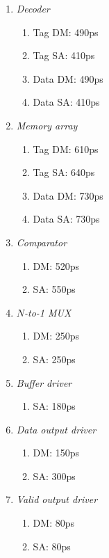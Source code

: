 \documentclass[11pt]{article}
\begin{document}

\begin{enumerate}[i]
	\item \textit{Decoder}
	      \begin{enumerate}[i]
		      \item Tag DM: 490ps
		      \item Tag SA: 410ps
		      \item Data DM: 490ps
		      \item Data SA: 410ps
	      \end{enumerate}
	\item \textit{Memory array}
	      \begin{enumerate}[i]
		      \item Tag DM: 610ps
		      \item Tag SA: 640ps
		      \item Data DM: 730ps
		      \item Data SA: 730ps
	      \end{enumerate}
	\item \textit{Comparator}
	      \begin{enumerate}[i]
		      \item DM: 520ps
		      \item SA: 550ps
	      \end{enumerate}
	\item \textit{$N$-to-1 MUX}
	      \begin{enumerate}[i]
		      \item DM: 250ps
		      \item SA: 250ps
	      \end{enumerate}
	\item \textit{Buffer driver}
	      \begin{enumerate}[i]
		      \item SA: 180ps
	      \end{enumerate}
	\item \textit{Data output driver}
	      \begin{enumerate}[i]
		      \item DM: 150ps
		      \item SA: 300ps
	      \end{enumerate}
	\item \textit{Valid output driver}
	      \begin{enumerate}[i]
		      \item DM: 80ps
		      \item SA: 80ps
	      \end{enumerate}
\end{enumerate}
\end{document}
